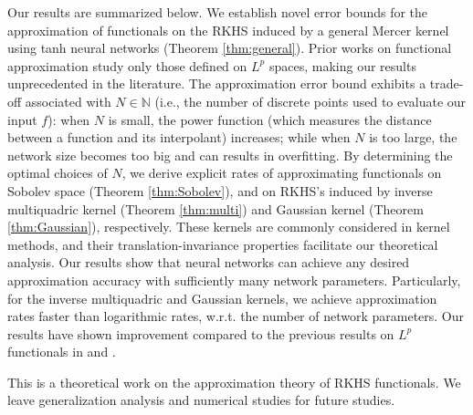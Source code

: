 \documentclass{article}
\def\NN{\mathbb N}
\numberwithin{equation}{section}
\begin{document}
Our results are summarized below. 
We establish novel error bounds for the approximation of functionals on the RKHS induced by a general Mercer kernel using tanh neural networks (Theorem \ref{thm:general}).
Prior works on functional approximation study only those defined on $L^p$ spaces, making our results unprecedented in the literature. 
The approximation error bound exhibits a trade-off associated with $N\in \NN$ (i.e., the number of discrete points used to evaluate our input $f$): when $N$ is small, the power function (which measures the distance between a function and its interpolant) increases; while when $N$ is too large, the network size becomes too big and can results in overfitting. 
By determining the optimal choices of $N$, 
we derive explicit rates of approximating functionals on Sobolev space (Theorem \ref{thm:Sobolev}), and on RKHS's induced by inverse multiquadric kernel (Theorem \ref{thm:multi}) and Gaussian kernel (Theorem \ref{thm:Gaussian}), respectively.
These kernels are commonly considered in kernel methods, and their translation-invariance properties facilitate our theoretical analysis. 
Our results show that neural networks can achieve any desired approximation accuracy with sufficiently many network parameters.
Particularly, for the inverse multiquadric and Gaussian kernels, we achieve approximation rates faster than logarithmic rates, w.r.t. the number of network parameters.  
Our results have shown improvement compared to the previous results on $L^p$ functionals in \citep{mhaskar1997neural} and \citep{song2023approximationarxiv}.


This is a theoretical work on the approximation theory of RKHS functionals. We leave generalization analysis and numerical studies for future studies.
\end{document}
